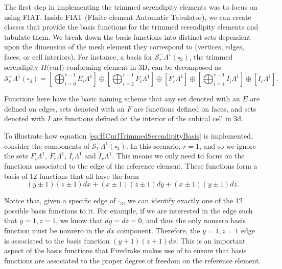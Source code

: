 \documentclass[manuscript,screen]{acmart}
\newcommand{\calS}{\mathcal{S}}
\begin{document}
 The first step in implementing the trimmed serendipity elements was to focus on using FIAT.  Inside FIAT (FInite element Automatic Tabulator), we can create classes that provide the basis functions for the trimmed serendipity elements and tabulate them.  We break down the basis functions into distinct sets dependent upon the dimension of the mesh element they correspond to (vertices, edges, faces, or cell interiors).  For instance, a basis for $\calS^-_r\Lambda^1(\square_3)$, the trimmed serendipity $H($curl$)$-conforming element in 3D, can be decomposed as
   \begin{equation}\label{eq:HCurlTrimmedSerendipityBasis}
   \calS^-_r\Lambda^1(\square_3) =    \left[\bigoplus_{i=0}^{r-1} E_i \Lambda^1\right]\oplus\left[ \bigoplus_{i=2}^{r-1}F_i \Lambda^1\right] \oplus \left[\tilde{F}_r \Lambda^1\right]\oplus\left[ \bigoplus_{i=4}^{r-1}I_i \Lambda^1 \right] \oplus \left[\tilde{I}_r \Lambda^1\right].
   \end{equation}
   
  Functions here have the basic naming scheme that any set denoted with an $E$ are defined on edges, sets denoted with an $F$ are functions defined on faces, and sets denoted with $I$ are functions defined on the interior of the cubical cell in 3d.
  
  \begin{example}\label{ex:UsingComputationalBasis}
  To illustrate how equation \ref{eq:HCurlTrimmedSerendipityBasis} is implemented, consider the components of $\calS_1^-\Lambda^1(\square_3)$.  In this scenario, $r=1$, and so we ignore the sets $F_i\Lambda^1$, $\tilde{F}_r\Lambda^1$, $I_i \Lambda^1$ and $\tilde{I}_r\Lambda^1$.  This means we only need to focus on the functions associated to the edge of the reference element.  These functions form a basis of $12$ functions that all have the form 
  \begin{equation*}
      (y\pm 1)(z\pm 1)dx + (x\pm 1)(z\pm 1) dy + (x \pm 1)(y \pm 1)dz.
  \end{equation*}
  
  Notice that, given a specific edge of $\square_3$, we can identify exactly one of the 12 possible basis functions to it.  For example, if we are interested in the edge such that $y=1, z=1$, we know that $dy = dz = 0$, and thus the only nonzero basis function must be nonzero in the $dx$ component. Therefore, the $y=1, z=1$ edge is associated to the basis function $(y+1)(z+1)dx$.  This is an important aspect of the basis functions that Firedrake makes use of to ensure that basis functions are associated to the proper degree of freedom on the reference element.
  \end{example}
 
\end{document}
